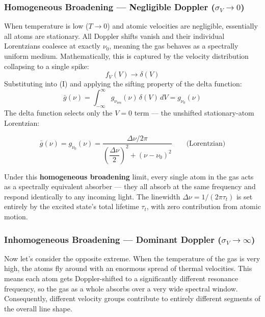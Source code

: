 \subsubsection{Homogeneous Broadening — Negligible Doppler ($\sigma_V \to 0$)}

When temperature is low ($T \to 0$) and atomic velocities are negligible, essentially all atoms are stationary. All Doppler shifts vanish and their individual Lorentzians coalesce at exactly $\nu_0$, meaning the gas behaves as a spectrally uniform medium. Mathematically, this is captured by the velocity distribution collapsing to a single spike:
\begin{equation*}
    f_V(V) \to \delta(V)
\end{equation*}
Substituting into \textup{(I)} and applying the sifting property of the delta function:
\begin{equation*}
    \bar{g}(\nu) = \int_{-\infty}^{\infty} g_{\nu_{\text{res}}}(\nu)\,\delta(V)\,dV = g_{\nu_0}(\nu)
\end{equation*}
The delta function selects only the $V = 0$ term — the unshifted stationary-atom Lorentzian:
\begin{keyresult}
    \begin{equation}
        \bar{g}(\nu) = g_{\nu_0}(\nu) = \frac{\Delta\nu/2\pi}{\left(\dfrac{\Delta\nu}{2}\right)^2 + (\nu - \nu_0)^2} \qquad \text{(Lorentzian)}
    \end{equation}
\end{keyresult}

Under this \textbf{homogeneous broadening} limit, every single atom in the gas acts as a spectrally equivalent absorber — they all absorb at the same frequency and respond identically to any incoming light. The linewidth $\Delta\nu = 1/(2\pi\tau_t)$ is set entirely by the excited state's total lifetime $\tau_t$, with zero contribution from atomic motion.

\subsubsection{Inhomogeneous Broadening — Dominant Doppler ($\sigma_V \to \infty$)}
Now let's consider the opposite extreme. When the temperature of the gas is very high, the atoms fly around with an enormous spread of thermal velocities. This means each atom gets Doppler-shifted to a significantly different resonance frequency, so the gas as a whole absorbs over a very wide spectral window. Consequently, different velocity groups contribute to entirely different segments of the overall line shape.

